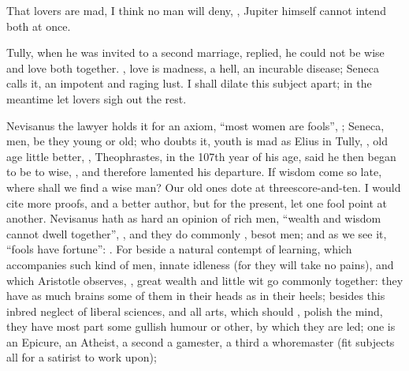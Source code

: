That lovers are mad, I think no man will deny, , Jupiter himself cannot intend both at
once.


Tully, when he was invited to a second marriage, replied, he could not
 be wise and love both together.
, love is madness, a hell, an incurable disease;  Seneca calls it, an impotent and raging
lust. I shall dilate this subject apart; in the meantime let lovers sigh out
the rest.

Nevisanus the lawyer holds it for an axiom, \enquote{most women are
fools}, ; Seneca, men, be
they young or old; who doubts it, youth is mad as Elius in Tully, , old age little better, , \etc{} Theophrastes,
in the 107th year of his age, said he then began to be to
wise, , and therefore lamented his departure. If wisdom
come so late, where shall we find a wise man? Our old ones dote at
threescore-and-ten. I would cite more proofs, and a better author, but for the
present, let one fool point at another. Nevisanus hath as
hard an opinion of rich men, \enquote{wealth and wisdom cannot
dwell together}, , and they
do commonly , besot men; and as
we see it, \enquote{fools have fortune}: . For beside a natural contempt of
learning, which accompanies such kind of men, innate idleness (for they will
take no pains), and which Aristotle observes, , great
wealth and little wit go commonly together: they have as much brains some of
them in their heads as in their heels; besides this inbred neglect of liberal
sciences, and all arts, which should , polish the mind,
they have most part some gullish humour or other, by which they are led; one is
an Epicure, an Atheist, a second a gamester, a third a whoremaster (fit
subjects all for a satirist to work upon);

